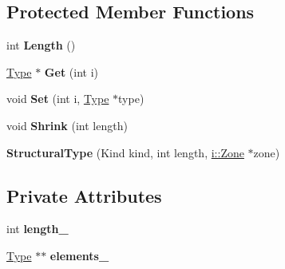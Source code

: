 \subsection*{Protected Member Functions}
\begin{DoxyCompactItemize}
\item 
int {\bfseries Length} ()\hypertarget{classv8_1_1internal_1_1_structural_type_a07053c2ec9b56f9dd548e3140e4956e7}{}\label{classv8_1_1internal_1_1_structural_type_a07053c2ec9b56f9dd548e3140e4956e7}

\item 
\hyperlink{classv8_1_1internal_1_1_type}{Type} $\ast$ {\bfseries Get} (int i)\hypertarget{classv8_1_1internal_1_1_structural_type_a92781abe0703a0480d6787a1e375397d}{}\label{classv8_1_1internal_1_1_structural_type_a92781abe0703a0480d6787a1e375397d}

\item 
void {\bfseries Set} (int i, \hyperlink{classv8_1_1internal_1_1_type}{Type} $\ast$type)\hypertarget{classv8_1_1internal_1_1_structural_type_a24e79bb8baaffdd4032531f3e524e743}{}\label{classv8_1_1internal_1_1_structural_type_a24e79bb8baaffdd4032531f3e524e743}

\item 
void {\bfseries Shrink} (int length)\hypertarget{classv8_1_1internal_1_1_structural_type_a4b0dcf623646d7b2a1cf166d15bc2308}{}\label{classv8_1_1internal_1_1_structural_type_a4b0dcf623646d7b2a1cf166d15bc2308}

\item 
{\bfseries Structural\+Type} (Kind kind, int length, \hyperlink{classv8_1_1internal_1_1_zone}{i\+::\+Zone} $\ast$zone)\hypertarget{classv8_1_1internal_1_1_structural_type_a964e9b481a913c0135401fb9f463fbc3}{}\label{classv8_1_1internal_1_1_structural_type_a964e9b481a913c0135401fb9f463fbc3}

\end{DoxyCompactItemize}
\subsection*{Private Attributes}
\begin{DoxyCompactItemize}
\item 
int {\bfseries length\+\_\+}\hypertarget{classv8_1_1internal_1_1_structural_type_a137d7d91321635c6753954d7d38d19f5}{}\label{classv8_1_1internal_1_1_structural_type_a137d7d91321635c6753954d7d38d19f5}

\item 
\hyperlink{classv8_1_1internal_1_1_type}{Type} $\ast$$\ast$ {\bfseries elements\+\_\+}\hypertarget{classv8_1_1internal_1_1_structural_type_a1bbfcbc271cf2e83bef12e5cb092171c}{}\label{classv8_1_1internal_1_1_structural_type_a1bbfcbc271cf2e83bef12e5cb092171c}

\end{DoxyCompactItemize}
